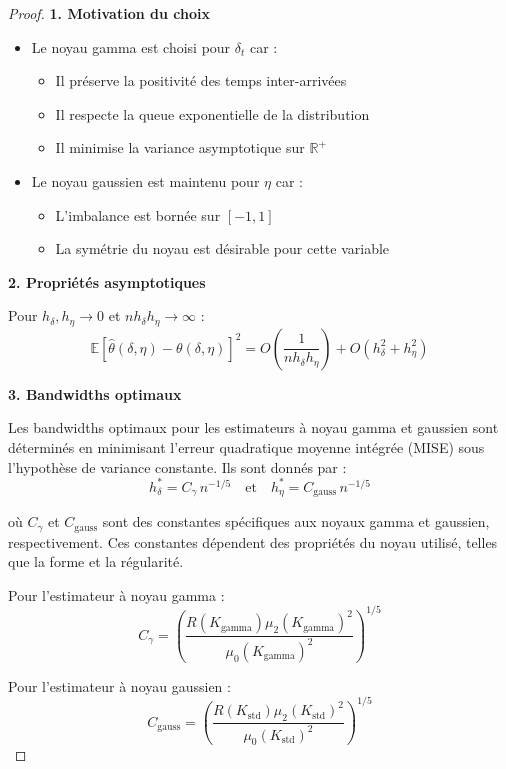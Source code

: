 \documentclass[12pt,a4paper]{article}
\theoremstyle{definition}
\theoremstyle{remark}
\begin{document}
    \begin{proof}
    \textbf{1. Motivation du choix}
    \begin{itemize}
        \item Le noyau gamma est choisi pour $\delta_t$ car :
        \begin{itemize}
            \item Il préserve la positivité des temps inter-arrivées
            \item Il respecte la queue exponentielle de la distribution
            \item Il minimise la variance asymptotique sur $\mathbb{R}^+$
        \end{itemize}
        
        \item Le noyau gaussien est maintenu pour $\eta$ car :
        \begin{itemize}
            \item L'imbalance est bornée sur $[-1,1]$
            \item La symétrie du noyau est désirable pour cette variable
        \end{itemize}
    \end{itemize}
    
    \textbf{2. Propriétés asymptotiques}
    
    Pour $h_\delta, h_\eta \to 0$ et $nh_\delta h_\eta \to \infty$ :
    \[
    \mathbb{E}[\hat{\theta}(\delta, \eta) - \theta(\delta, \eta)]^2 = O\left(\frac{1}{nh_\delta h_\eta}\right) + O(h_\delta^2 + h_\eta^2)
    \]
    
    \textbf{3. Bandwidths optimaux}
    
    Les bandwidths optimaux pour les estimateurs à noyau gamma et gaussien sont déterminés en minimisant l'erreur quadratique moyenne intégrée (MISE) sous l'hypothèse de variance constante. Ils sont donnés par :
    \[
    h_\delta^* = C_\gamma \, n^{-1/5} \quad \text{et} \quad h_\eta^* = C_{\text{gauss}} \, n^{-1/5}
    \]
    
    où \(C_\gamma\) et \(C_{\text{gauss}}\) sont des constantes spécifiques aux noyaux gamma et gaussien, respectivement. Ces constantes dépendent des propriétés du noyau utilisé, telles que la forme et la régularité.

    Pour l'estimateur à noyau gamma :
    \[
    C_\gamma = \left( \frac{R(K_{\text{gamma}}) \mu_2(K_{\text{gamma}})^2}{\mu_{0}(K_{\text{gamma}})^2} \right)^{1/5}
    \]
    
    Pour l'estimateur à noyau gaussien :
    \[
    C_{\text{gauss}} = \left( \frac{R(K_{\text{std}}) \mu_2(K_{\text{std}})^2}{\mu_{0}(K_{\text{std}})^2} \right)^{1/5}
    \]
    

\end{proof}
\end{document}
